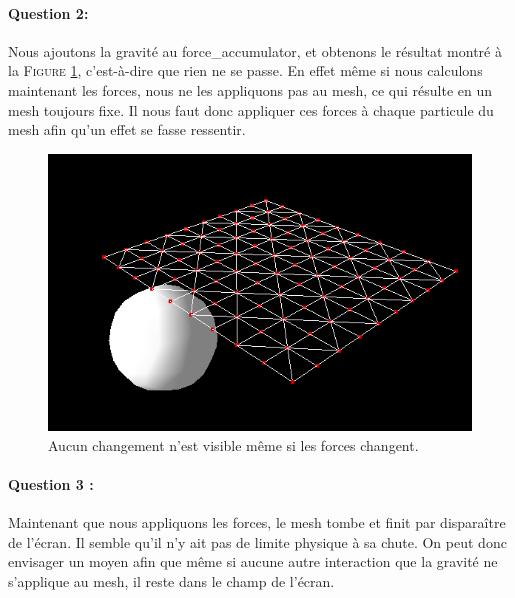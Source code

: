 \documentclass[a4paper,12pt]{article}
\begin{document}
\paragraph{Question 2:} Nous ajoutons la gravité au \og{}force\_accumulator\fg{}, et obtenons le résultat montré à la \textsc{Figure} \ref{fig:q2}, c'est-à-dire que rien ne se passe. En effet même si nous calculons maintenant les forces, nous ne les appliquons pas au mesh, ce qui résulte en un mesh toujours fixe. Il nous faut donc appliquer ces forces à chaque particule du mesh afin qu'un effet se fasse ressentir.
\begin{figure}[ht!]
  \centering
  \includegraphics[width=\textwidth]{images/q2.png}
  \caption{Aucun changement n'est visible même si les forces changent.}
  \label{fig:q2}
\end{figure}

\paragraph{Question 3 :} Maintenant que nous appliquons les forces, le mesh tombe et finit par disparaître de l'écran. Il semble qu'il n'y ait pas de limite physique à sa chute. On peut donc envisager un moyen afin que même si aucune autre interaction que la gravité ne s'applique au mesh, il reste dans le champ de l'écran.
\end{document}
